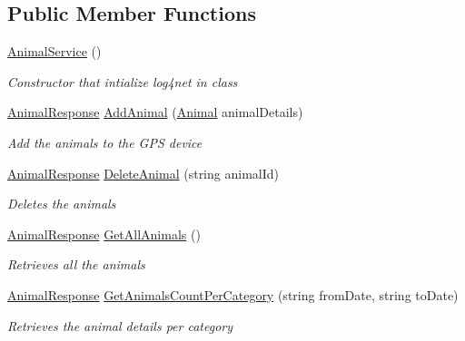 \subsection*{Public Member Functions}
\begin{DoxyCompactItemize}
\item 
\hyperlink{classWildLifeTracker_1_1Services_1_1AnimalService_aec71da8266bf866afd3e09fa74e2bf6b}{Animal\+Service} ()
\begin{DoxyCompactList}\small\item\em Constructor that intialize log4net in class \end{DoxyCompactList}\item 
\hyperlink{classWildLifeTracker_1_1Response_1_1AnimalResponse}{Animal\+Response} \hyperlink{classWildLifeTracker_1_1Services_1_1AnimalService_ae578d708ed9407d8805d69b193eff67b}{Add\+Animal} (\hyperlink{classWildLifeTracker_1_1Models_1_1Animal}{Animal} animal\+Details)
\begin{DoxyCompactList}\small\item\em Add the animals to the G\+PS device \end{DoxyCompactList}\item 
\hyperlink{classWildLifeTracker_1_1Response_1_1AnimalResponse}{Animal\+Response} \hyperlink{classWildLifeTracker_1_1Services_1_1AnimalService_a201e384747e50bd19c431955eae072fa}{Delete\+Animal} (string animal\+Id)
\begin{DoxyCompactList}\small\item\em Deletes the animals \end{DoxyCompactList}\item 
\hyperlink{classWildLifeTracker_1_1Response_1_1AnimalResponse}{Animal\+Response} \hyperlink{classWildLifeTracker_1_1Services_1_1AnimalService_a38b8ef318dc92ac93cfcbbc33a454c5a}{Get\+All\+Animals} ()
\begin{DoxyCompactList}\small\item\em Retrieves all the animals \end{DoxyCompactList}\item 
\hyperlink{classWildLifeTracker_1_1Response_1_1AnimalResponse}{Animal\+Response} \hyperlink{classWildLifeTracker_1_1Services_1_1AnimalService_aa4dc53f849ee7b88879fa17f9d48bd42}{Get\+Animals\+Count\+Per\+Category} (string from\+Date, string to\+Date)
\begin{DoxyCompactList}\small\item\em Retrieves the animal details per category \end{DoxyCompactList}\item 

\end{DoxyCompactItemize}
